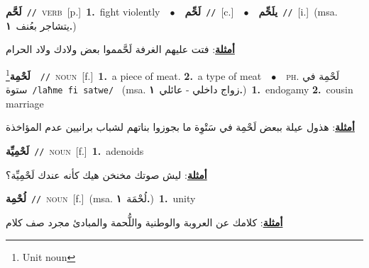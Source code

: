 \documentclass[10pt,a4paper,twoside]{article} %
\begin{document}
\begin{multicols}{2}
{\setlength\topsep{0pt}\textbf{\foreignlanguage{arabic}{لَحَّم}}\ {\color{gray}\texttt{//}\color{black}}\ \textsc{verb}\ [p.]\ \textbf{1.}~fight violently\ \ $\bullet$\ \ \setlength\topsep{0pt}\textbf{\foreignlanguage{arabic}{لَحِّم}}\ {\color{gray}\texttt{//}\color{black}}\ [c.]\ \ $\bullet$\ \ \setlength\topsep{0pt}\textbf{\foreignlanguage{arabic}{يلَحِّم}}\ {\color{gray}\texttt{//}\color{black}}\ [i.]\ \color{gray}(msa. \foreignlanguage{arabic}{يتشاجر بعُنف}~\foreignlanguage{arabic}{\textbf{١.}})\color{black}\  \begin{flushright}\color{gray}\foreignlanguage{arabic}{\textbf{\underline{\foreignlanguage{arabic}{أمثلة}}}: فتت عليهم الغرفة لَحَّمموا بعض ولادك ولاد الحرام}\end{flushright}\color{black}} \vspace{2mm}

{\setlength\topsep{0pt}\textbf{\foreignlanguage{arabic}{لَحْمِة}}\footnote{Unit noun}\ \ {\color{gray}\texttt{//}\color{black}}\ \textsc{noun}\ [f.]\ \textbf{1.}~a piece of meat.  \textbf{2.}~a type of meat\ \ $\bullet$\ \ \textsc{ph.} \color{gray} \foreignlanguage{arabic}{لَحْمِة في ستوة}\color{black}\ {\color{gray}\texttt{/{\sffamily laħme fi satwe}/}\color{black}}\ \color{gray} (msa. \foreignlanguage{arabic}{زواج داخلي - عائلي}~\foreignlanguage{arabic}{\textbf{١.}})\color{black}\ \textbf{1.}~endogamy  \textbf{2.}~cousin marriage\  \begin{flushright}\color{gray}\foreignlanguage{arabic}{\textbf{\underline{\foreignlanguage{arabic}{أمثلة}}}: هذول عيلة ببعض لَحْمِة في سَتْوِة ما بجوزوا بناتهم لشباب برانيين عدم المؤاخذة}\end{flushright}\color{black}} \vspace{2mm}

{\setlength\topsep{0pt}\textbf{\foreignlanguage{arabic}{لَحْمِيِّة}}\ {\color{gray}\texttt{//}\color{black}}\ \textsc{noun}\ [f.]\ \textbf{1.}~adenoids\  \begin{flushright}\color{gray}\foreignlanguage{arabic}{\textbf{\underline{\foreignlanguage{arabic}{أمثلة}}}: ليش صوتك مخنخن هيك كأنه عندك لَحْمِيِّة؟}\end{flushright}\color{black}} \vspace{2mm}

{\setlength\topsep{0pt}\textbf{\foreignlanguage{arabic}{لُحْمِة}}\ {\color{gray}\texttt{//}\color{black}}\ \textsc{noun}\ [f.]\ \color{gray}(msa. \foreignlanguage{arabic}{لُحْمَة}~\foreignlanguage{arabic}{\textbf{١.}})\color{black}\ \textbf{1.}~unity\  \begin{flushright}\color{gray}\foreignlanguage{arabic}{\textbf{\underline{\foreignlanguage{arabic}{أمثلة}}}: كلامك عن العروبة والوطنية واللُّحمة والمبادئ مجرد صف كلام}\end{flushright}\color{black}} \vspace{2mm}


\end{multicols}
\end{document}
